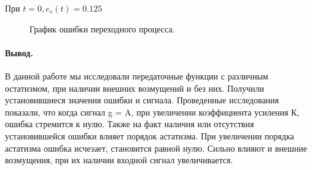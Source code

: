 \documentclass[a4paper, 11pt]{article}
\begin{document}
\normalsize{При $t=0, e_s(t)=0.125$}

\begin{figure}[h]
    \caption{График ошибки переходного процесса.}
    \label{tree}
\end{figure}

\paragraph{Вывод.} В данной работе мы исследовали передаточные функции с различным остатизмом, при наличии внешних возмущений и без них. Получили установившиеся значения ошибки и сигнала. Проведенные исследования показали, что когда сигнал g = A, при увеличении коэффициента усиления К, ошибка стремится к нулю. Также на факт наличия или отсутствия установившейся ошибки влияет порядок астатизма. При увеличении порядка астатизма ошибка исчезает, становится равной нулю. Сильно влияют и внешние возмущения, при их наличии входной сигнал увеличивается.
\end{document}

